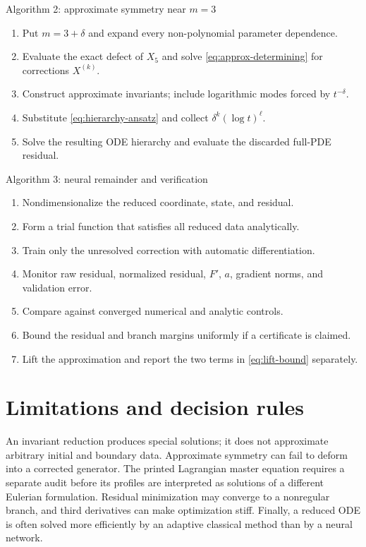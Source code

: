 \documentclass[11pt]{article}
\begin{document}
\begin{instruction}{Algorithm 2: approximate symmetry near $m=3$}
\begin{enumerate}[label=\arabic*.]
\item Put $m=3+\delta$ and expand every non-polynomial parameter dependence.
\item Evaluate the exact defect of $X_5$ and solve \cref{eq:approx-determining} for corrections $X^{(k)}$.
\item Construct approximate invariants; include logarithmic modes forced by $t^{-\delta}$.
\item Substitute \cref{eq:hierarchy-ansatz} and collect $\delta^k(\log t)^\ell$.
\item Solve the resulting ODE hierarchy and evaluate the discarded full-PDE residual.
\end{enumerate}
\end{instruction}

\begin{instruction}{Algorithm 3: neural remainder and verification}
\begin{enumerate}[label=\arabic*.]
\item Nondimensionalize the reduced coordinate, state, and residual.
\item Form a trial function that satisfies all reduced data analytically.
\item Train only the unresolved correction with automatic differentiation.
\item Monitor raw residual, normalized residual, $F'$, $a$, gradient norms, and validation error.
\item Compare against converged numerical and analytic controls.
\item Bound the residual and branch margins uniformly if a certificate is claimed.
\item Lift the approximation and report the two terms in \cref{eq:lift-bound} separately.
\end{enumerate}
\end{instruction}

\section{Limitations and decision rules}

An invariant reduction produces special solutions; it does not approximate arbitrary initial and boundary data.  Approximate symmetry can fail to deform into a corrected generator.  The printed Lagrangian master equation requires a separate audit before its profiles are interpreted as solutions of a different Eulerian formulation.  Residual minimization may converge to a nonregular branch, and third derivatives can make optimization stiff.  Finally, a reduced ODE is often solved more efficiently by an adaptive classical method than by a neural network.
\end{document}
